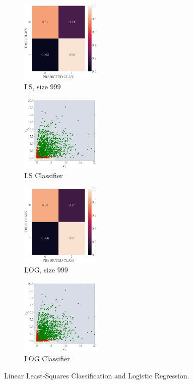 \documentclass[12pt, a4 paper]{article}
\begin{document}
\begin{figure}[!htbp]
    \begin{subfigure}[!htbp]{0.2\textwidth}
       \centering
       \includegraphics[width=1.5in]{../results/ex1/acc_LS_dataset_Gamma_size_999.pdf}
       \caption{LS, size $999$}
       \label{fig:LS_P1a_999}
    \end{subfigure}
\quad
    \begin{subfigure}[!htbp]{0.2\textwidth}
       \centering
       \includegraphics[width=1.5in]{../results/ex1/samples_LS_dataset_Gamma_size_999.pdf}
       \caption{LS Classifier}
       \label{fig:LSD_P1a_999}
    \end{subfigure}
\quad
    \begin{subfigure}[!htbp]{0.2\textwidth}
       \centering
       \includegraphics[width=1.5in]{../results/ex1/acc_LOG_dataset_Gamma_size_999.pdf}
       \caption{LOG, size $999$}
       \label{fig:LOG_P1a_999}
    \end{subfigure}
\quad
    \begin{subfigure}[!htbp]{0.2\textwidth}
       \centering
       \includegraphics[width=1.5in]{../results/ex1/samples_LOG_dataset_Gamma_size_999.pdf}
       \caption{LOG Classifier}
       \label{fig:LOGD_P1a_999}
    \end{subfigure}     

\caption{Linear Least-Squares Classification and Logistic Regression.}
\label{fig:ex1_P1a}
\end{figure}
\end{document}
